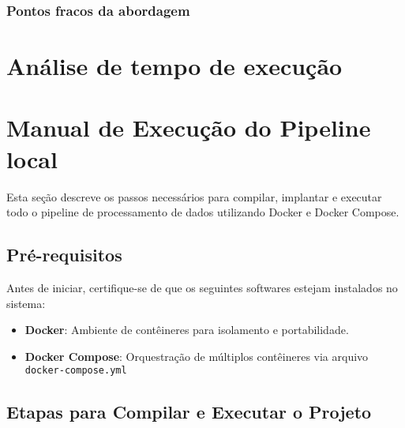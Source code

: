 \documentclass[a4paper,12pt]{article}
\begin{document}
\subsubsection*{Pontos fracos da abordagem}




\section{Análise de tempo de execução}



\section{Manual de Execução do Pipeline local}

Esta seção descreve os passos necessários para compilar, implantar e executar todo o pipeline de processamento de dados utilizando Docker e Docker Compose.

\subsection*{Pré-requisitos}

Antes de iniciar, certifique-se de que os seguintes softwares estejam instalados no sistema:

\begin{itemize}
    \item \textbf{Docker}: Ambiente de contêineres para isolamento e portabilidade.
    \item \textbf{Docker Compose}: Orquestração de múltiplos contêineres via arquivo \texttt{docker-compose.yml}
\end{itemize}

\subsection*{Etapas para Compilar e Executar o Projeto}
\end{document}
